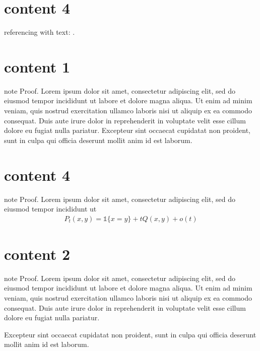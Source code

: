 \chapter{content 4}
\label{\detokenize{algorithm/_algo_text_reference:content-4}}\label{\detokenize{algorithm/_algo_text_reference::doc}}
\sphinxAtStartPar
referencing with text: {\hyperref[\detokenize{algorithm/_algo_labeled_titled_with_classname:test-algo-label}]{}}.


\chapter{content 1}
\label{\detokenize{proof/_proof_with_classname:content-1}}\label{\detokenize{proof/_proof_with_classname::doc}}
\begin{sphinxadmonition}{note}
\sphinxAtStartPar
Proof. Lorem ipsum dolor sit amet, consectetur adipiscing elit, sed do eiusmod tempor incididunt ut labore et dolore magna aliqua. Ut enim ad minim veniam, quis nostrud exercitation ullamco laboris nisi ut aliquip ex ea commodo consequat. Duis aute irure dolor in reprehenderit in voluptate velit esse cillum dolore eu fugiat nulla pariatur. Excepteur sint occaecat cupidatat non proident, sunt in culpa qui officia deserunt mollit anim id est laborum.
\end{sphinxadmonition}


\chapter{content 4}
\label{\detokenize{proof/_proof_with_labeled_math:content-4}}\label{\detokenize{proof/_proof_with_labeled_math::doc}}
\begin{sphinxadmonition}{note}
\sphinxAtStartPar
Proof. Lorem ipsum dolor sit amet, consectetur adipiscing elit, sed do eiusmod tempor incididunt ut
\begin{equation}\label{equation:proof/_proof_with_labeled_math:label1}
\begin{split}P_t(x, y) = \mathbb 1\{x = y\} + t Q(x, y) + o(t)\end{split}
\end{equation}\end{sphinxadmonition}


\chapter{content 2}
\label{\detokenize{proof/_proof_no_classname:content-2}}\label{\detokenize{proof/_proof_no_classname::doc}}
\begin{sphinxadmonition}{note}
\sphinxAtStartPar
Proof. Lorem ipsum dolor sit amet, consectetur adipiscing elit, sed do eiusmod tempor incididunt ut labore et dolore magna aliqua.
Ut enim ad minim veniam, quis nostrud exercitation ullamco laboris nisi ut aliquip ex ea commodo consequat. Duis aute irure dolor in reprehenderit in voluptate velit esse cillum dolore eu fugiat nulla pariatur.

\sphinxAtStartPar
Excepteur sint occaecat cupidatat non proident, sunt in culpa qui officia deserunt mollit anim id est laborum.
\end{sphinxadmonition}



